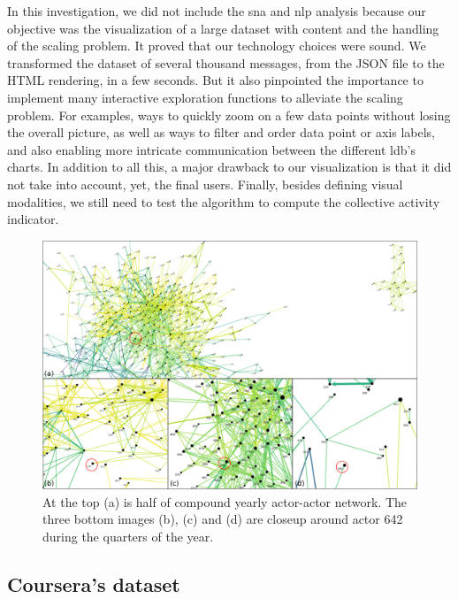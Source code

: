 \documentclass[a4paper,twoside]{article}
\begin{document}
In this investigation, we did not include the \gls{sna} and \gls{nlp} analysis because our objective was the visualization of a large dataset with content and the handling of the scaling problem.  It proved that our technology choices were sound.  We transformed the dataset of several thousand messages, from the JSON file to the HTML rendering, in a few seconds.
But it also pinpointed the importance to implement many interactive exploration functions to alleviate the scaling problem.  For examples, ways to quickly zoom on a few data points without losing the overall picture, as well as ways to filter and order data point or axis labels, and also enabling more intricate communication between the different \gls{ldb}'s charts.
In addition to all this, a major drawback to our visualization is that it did not take into account, yet, the final users.
Finally, besides defining visual modalities, we still need to test the algorithm to compute the collective activity indicator.

\begin{figure}[t]
 \centering
 \includegraphics[width=\textwidth]{images/evolution.png}
 \small{
  \caption{\label{fig:evolution}
   At the top (a) is half of compound yearly actor-actor network.  The three bottom images (b), (c) and (d) are closeup around actor 642 during the quarters of the year.  }}
\end{figure}

\subsection{Coursera's dataset}
\end{document}
